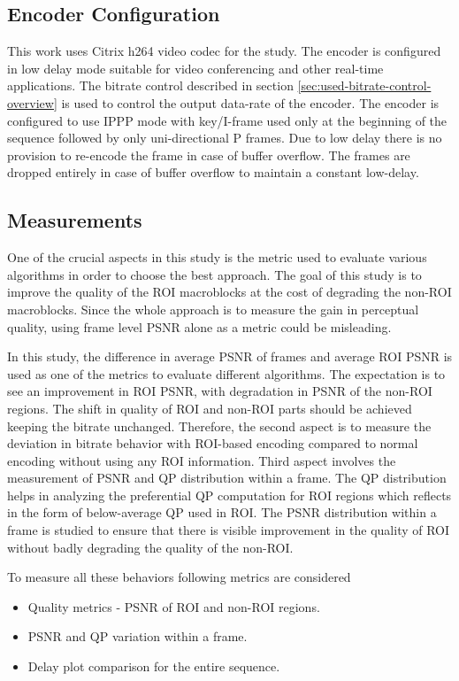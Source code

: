 \documentclass[11pt]{article} %
\begin{document}
\subsection{Encoder Configuration} \label {sec:Encoder configuration}     
This work uses Citrix h264 video codec for the study. The encoder is configured in low delay mode suitable for video conferencing and other real-time applications. The bitrate control described in section \ref{sec:used-bitrate-control-overview} is used to control the output data-rate of the encoder. The encoder is configured to use IPPP mode with key/I-frame used only at the beginning of the sequence followed by only uni-directional P frames. Due to low delay there is no provision to re-encode the frame in case of buffer overflow. The frames are dropped entirely in case of buffer overflow to maintain a constant low-delay.

\subsection{Measurements}
One of the crucial aspects in this study is the metric used to evaluate various algorithms in order to choose the best approach. The goal of this study is to improve the quality of the ROI macroblocks at the cost of degrading the non-ROI macroblocks. Since the whole approach is to measure the gain in perceptual quality, using frame level PSNR alone as a metric could be misleading. 

In this study, the difference in average PSNR of frames and average ROI PSNR is used as one of the metrics to evaluate different algorithms. The expectation is to see an improvement in ROI PSNR, with degradation in PSNR of the non-ROI regions. The shift in quality of ROI and non-ROI parts should be achieved keeping the bitrate unchanged. Therefore, the second aspect is to measure the deviation in bitrate behavior with ROI-based encoding compared to normal encoding without using any ROI information. Third aspect involves the measurement of PSNR and QP distribution within a frame. The QP distribution helps in analyzing the preferential QP computation for ROI regions which reflects in the form of below-average QP used in ROI. The PSNR distribution within a frame is studied to ensure that there is visible improvement in the quality of ROI without badly degrading the quality of the non-ROI. 

To measure all these behaviors following metrics are considered
\begin{itemize}  
\item Quality metrics - PSNR of ROI and non-ROI regions.
\item PSNR and QP variation within a frame.
\item Delay plot comparison for the entire sequence.
\end{itemize}
\end{document}
